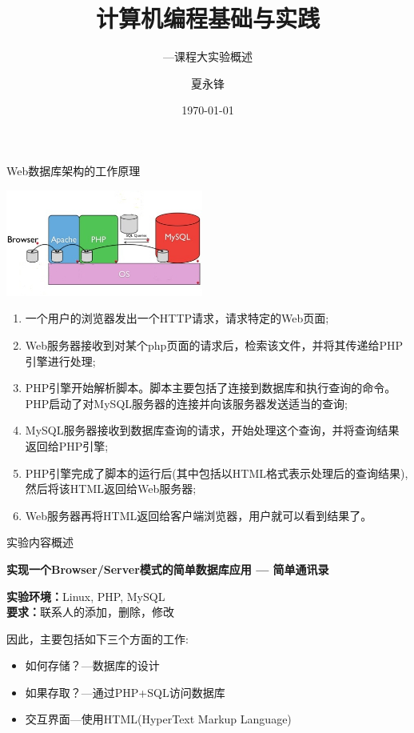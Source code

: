 \documentclass[CJK]{beamer}
\begin{document}
\begin{CJK*}{UTF8}{gbsn}

\title{计算机编程基础与实践}
\subtitle{---课程大实验概述}
\author{夏永锋}
\date{\today}

\begin{frame}
	\titlepage
\end{frame}

\begin{frame}{Web数据库架构的工作原理}
\begin{center}
	\includegraphics[height=3.5cm]{AMP.jpg}
\end{center}
{\tiny
\begin{block}{}
\begin{enumerate}
	\item 一个用户的浏览器发出一个HTTP请求，请求特定的Web页面;
	\item Web服务器接收到对某个php页面的请求后，检索该文件，并将其传递给PHP引擎进行处理;
	\item PHP引擎开始解析脚本。脚本主要包括了连接到数据库和执行查询的命令。PHP启动了对MySQL服务器的连接并向该服务器发送适当的查询;
	\item MySQL服务器接收到数据库查询的请求，开始处理这个查询，并将查询结果返回给PHP引擎;
	\item PHP引擎完成了脚本的运行后(其中包括以HTML格式表示处理后的查询结果),然后将该HTML返回给Web服务器;
	\item Web服务器再将HTML返回给客户端浏览器，用户就可以看到结果了。
\end{enumerate}
\end{block}
}
\end{frame}
\begin{frame}{实验内容概述}
\begin{block}{}
{\bf	实现一个Browser/Server模式的简单数据库应用 --- 简单通讯录}
\end{block}
\begin{block}{}
{\bf 实验环境：}Linux, PHP, MySQL\\
{\bf 要求：}联系人的添加，删除，修改
\end{block}
因此，主要包括如下三个方面的工作:
\begin{block}{}
	\begin{itemize}
		\item 如何存储？---数据库的设计
		\item 如果存取？---通过PHP+SQL访问数据库
		\item 交互界面---使用HTML(HyperText Markup Language)
	\end{itemize}
\end{block}
\end{frame}


\end{CJK*}
\end{document}

